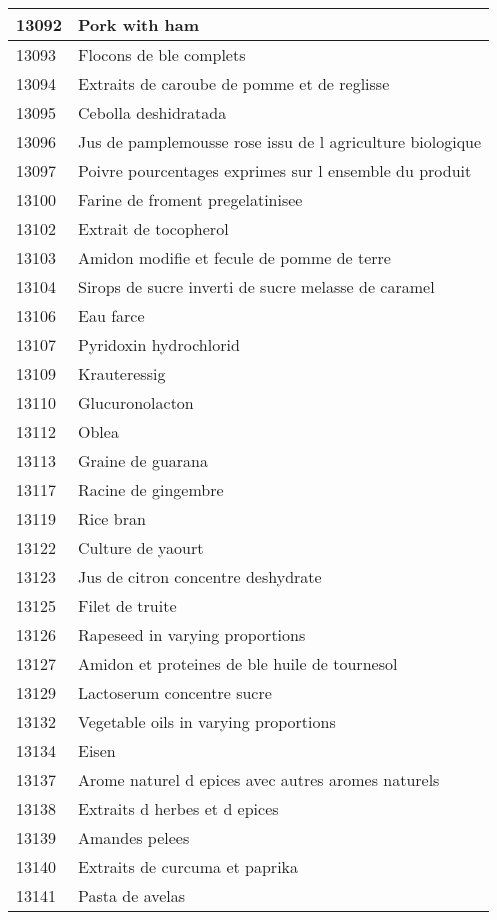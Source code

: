 \begin{longtable}{|l|l|}
13092 & Pork with ham \\ \hline 
13093 & Flocons de ble complets \\ \hline 
13094 & Extraits de caroube de pomme et de reglisse \\ \hline 
13095 & Cebolla deshidratada \\ \hline 
13096 & Jus de pamplemousse rose issu de l agriculture biologique \\ \hline 
13097 & Poivre pourcentages exprimes sur l ensemble du produit \\ \hline 
13100 & Farine de froment pregelatinisee \\ \hline 
13102 & Extrait de tocopherol \\ \hline 
13103 & Amidon modifie et fecule de pomme de terre \\ \hline 
13104 & Sirops de sucre inverti de sucre melasse de caramel \\ \hline 
13106 & Eau farce \\ \hline 
13107 & Pyridoxin hydrochlorid \\ \hline 
13109 & Krauteressig \\ \hline 
13110 & Glucuronolacton \\ \hline 
13112 & Oblea \\ \hline 
13113 & Graine de guarana \\ \hline 
13117 & Racine de gingembre \\ \hline 
13119 & Rice bran \\ \hline 
13122 & Culture de yaourt \\ \hline 
13123 & Jus de citron concentre deshydrate \\ \hline 
13125 & Filet de truite \\ \hline 
13126 & Rapeseed in varying proportions \\ \hline 
13127 & Amidon et proteines de ble huile de tournesol \\ \hline 
13129 & Lactoserum concentre sucre \\ \hline 
13132 & Vegetable oils in varying proportions \\ \hline 
13134 & Eisen \\ \hline 
13137 & Arome naturel d epices avec autres aromes naturels \\ \hline 
13138 & Extraits d herbes et d epices \\ \hline 
13139 & Amandes pelees \\ \hline 
13140 & Extraits de curcuma et paprika \\ \hline 
13141 & Pasta de avelas \\ \hline 

\end{longtable}
